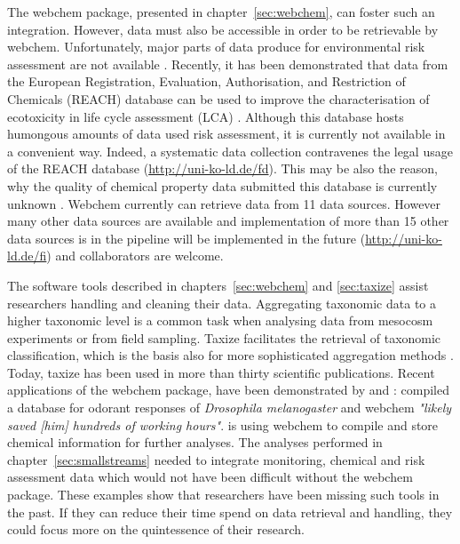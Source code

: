 The webchem package, presented in chapter~\ref{sec:webchem}, can foster such an integration.
However, data must also be accessible in order to be retrievable by webchem. 
Unfortunately, major parts of data produce for environmental risk assessment are not available \citep{schafer_letter_2013, dafforn_big_2015}. 
Recently, it has been demonstrated that data from the European Registration, Evaluation, Authorisation, and Restriction of Chemicals (REACH) database can be used to improve the characterisation of ecotoxicity in life cycle assessment (LCA) \citep{muller_exploring_2016}.
Although this database hosts humongous amounts of data used risk assessment, it is currently not available in a convenient way.
Indeed, a systematic data collection contravenes the legal usage of the REACH database (\url{http://uni-ko-ld.de/fd}).
This may be also the reason, why the quality of chemical property data submitted this database is currently unknown \citep{stieger_assessing_2014, muller_exploring_2016}. 
Webchem currently can retrieve data from 11 data sources. 
However many other data sources are available and implementation of more than 15 other data sources is in the pipeline will be implemented in the future (\url{http://uni-ko-ld.de/fi}) and collaborators are welcome.

The software tools described in chapters~\ref{sec:webchem} and \ref{sec:taxize} assist researchers handling and cleaning their data. 
Aggregating taxonomic data to a higher taxonomic level is a common task when analysing data from mesocosm experiments or from field sampling.
Taxize facilitates the retrieval of taxonomic classification, which is the basis also for more sophisticated aggregation methods \citep{cuffney_ambiguous_2007}. 
Today, taxize has been used in more than thirty scientific publications.
Recent applications of the webchem package, have been demonstrated by \citet{munch_door_2016} and \citet{ranke_chents_2016}: 
\citet{munch_door_2016} compiled a database for odorant responses of \textit{Drosophila melanogaster} and webchem \emph{"likely saved [him] hundreds of working hours"}. 
\citet{ranke_chents_2016} is using webchem to compile and store chemical information for further analyses. 
The analyses performed in chapter~\ref{sec:smallstreams} needed to integrate monitoring, chemical and risk assessment data which would not have been difficult without the webchem package. 
These examples show that researchers have been missing such tools in the past.
If they can reduce their time spend on data retrieval and handling, they could focus more on the quintessence of their research. 



